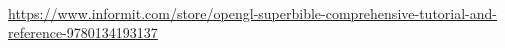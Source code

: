 \documentclass[calcdimensions,landscape,letterpaper]{powersem}
\newcommand{\thecurrentheading}{}
\newcommand{\heading}[1]{\renewcommand{\thecurrentheading}{#1}}
\begin{document}
\begin{slide}
  \heading{OpenGL Superbible}
  \begin{center}
    \\
    {\small \url{https://www.informit.com/store/opengl-superbible-comprehensive-tutorial-and-reference-9780134193137}}
  \end{center}
\end{slide}
\end{document}

